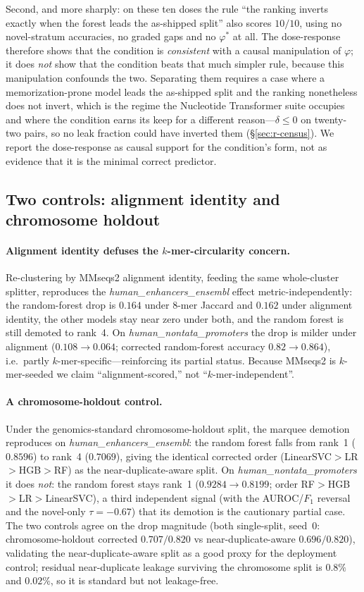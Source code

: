 \documentclass[webpdf,modern,large,namedate]{oup-authoring-template}%
\begin{document}
Second, and more sharply: on these ten doses the rule ``the ranking inverts exactly when the forest leads the as-shipped split'' also scores $10/10$, using no novel-stratum accuracies, no graded gaps and no $\varphi^{*}$ at all. The dose-response therefore shows that the condition is \emph{consistent} with a causal manipulation of $\varphi$; it does \emph{not} show that the condition beats that much simpler rule, because this manipulation confounds the two. Separating them requires a case where a memorization-prone model leads the as-shipped split and the ranking nonetheless does not invert, which is the regime the Nucleotide Transformer suite occupies and where the condition earns its keep for a different reason---$\delta\le0$ on twenty-two pairs, so no leak fraction could have inverted them (\S\ref{sec:r-census}). We report the dose-response as causal support for the condition's form, not as evidence that it is the minimal correct predictor.

\subsection{Two controls: alignment identity and chromosome holdout}\label{sec:r-controls}
\paragraph{Alignment identity defuses the $k$-mer-circularity concern.}
Re-clustering by MMseqs2 alignment identity, feeding the same whole-cluster splitter, reproduces the \textit{human\_enhancers\_ensembl} effect metric-independently: the random-forest drop is $0.164$ under $8$-mer Jaccard and $0.162$ under alignment identity, the other models stay near zero under both, and the random forest is still demoted to rank~4. On \textit{human\_nontata\_promoters} the drop is milder under alignment ($0.108\to0.064$; corrected random-forest accuracy $0.82\to0.864$), i.e.\ partly $k$-mer-specific---reinforcing its partial status. Because MMseqs2 is $k$-mer-seeded we claim ``alignment-scored,'' not ``$k$-mer-independent''.

\paragraph{A chromosome-holdout control.}\label{sec:chrom}
Under the genomics-standard chromosome-holdout split, the marquee demotion reproduces on \textit{human\_enhancers\_ensembl}: the random forest falls from rank~1 ($0.8596$) to rank~4 ($0.7069$), giving the identical corrected order (LinearSVC$>$LR$>$HGB$>$RF) as the near-duplicate-aware split. On \textit{human\_nontata\_promoters} it does \emph{not}: the random forest stays rank~1 ($0.9284\to0.8199$; order RF$>$HGB$>$LR$>$LinearSVC), a third independent signal (with the AUROC/$F_1$ reversal and the novel-only $\tau=-0.67$) that its demotion is the cautionary partial case. The two controls agree on the drop magnitude (both single-split, seed~0: chromosome-holdout corrected $0.707/0.820$ vs near-duplicate-aware $0.696/0.820$), validating the near-duplicate-aware split as a good proxy for the deployment control; residual near-duplicate leakage surviving the chromosome split is $0.8\%$ and $0.02\%$, so it is standard but not leakage-free.
\end{document}

